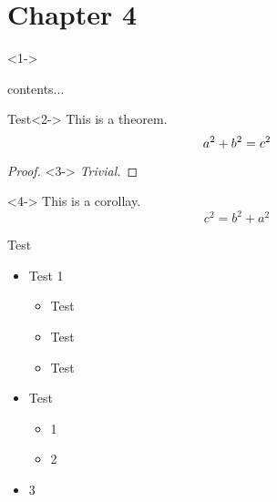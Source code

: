 \documentclass{beamer}
\newtheorem{proof}{Proof}
\begin{document}
	\section{Chapter 4}	
	
	\begin{frame}<1->
		 \begin{thm}
	        contents...
	        \label{thm-1}
		 \end{thm}
		\begin{block}{Test}<2->
            This is a theorem.
            \begin{equation}
                a^2 + b^2 = c^2
            	\notag	
            	\label{equ-3}
            	\end{equation}
        \end{block}
    	
		\begin{proof}<3->
            \textit{Trivial.} 
        \end{proof}
		            
        \begin{corollary}<4->
            This is a corollay.
            \begin{equation}
                c^2 = b^2 + a^2
                \label{equ-4}
            \end{equation}
        \end{corollary}
	\end{frame}
	
	\begin{frame}{Test}
		\begin{itemize}
			\item Test 1
			\begin{itemize}
				\item Test
				\item Test
				\item Test 
			\end{itemize}
			\item Test
			\begin{itemize}
				\item 1
				\item 2
			\end{itemize}
		\item 3
		\end{itemize}
		
	\end{frame}

%		
%			
%				
\end{document}
